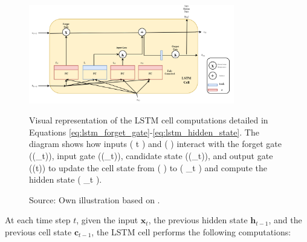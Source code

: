 \begin{figure}[htbp]
  \centering
  \includegraphics[width=0.8\textwidth]{figures/lstmcell.png}
  \caption{Visual representation of the LSTM cell computations detailed in Equations \ref{eq:lstm_forget_gate}-\ref{eq:lstm_hidden_state}. The diagram shows how inputs ( t ) and (  ) interact with the forget gate ((_t)), input gate ((_t)), candidate state ((_t)), and output gate ((t)) to update the cell state from (  ) to ( _t ) and compute the hidden state ( _t ).}
  \caption*{Source: Own illustration based on \autocite{geron2022hands}.}
  \label{fig:lstm_cell}
\end{figure}
At each time step \( t \), given the input \( \bm{x}_t \), the previous hidden state \( \bm{h}_{t-1} \), and the previous cell state \( \bm{c}_{t-1} \), the LSTM cell performs the following computations:

